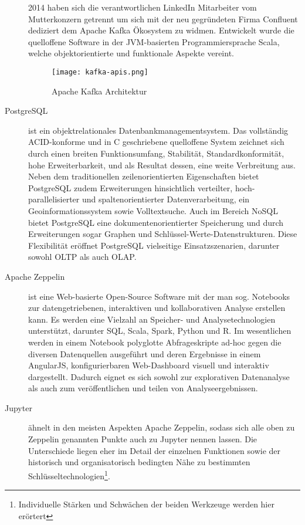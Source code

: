 \begin{description}
	2014 haben sich die verantwortlichen LinkedIn Mitarbeiter vom Mutterkonzern getrennt um sich mit der neu gegründeten Firma Confluent dediziert dem Apache Kafka Ökosystem zu widmen. Entwickelt wurde die quelloffene Software in der JVM-basierten Programmiersprache Scala, welche objektorientierte und funktionale Aspekte vereint.\autocite{kafka.apache} \autocite{wikiKafka} 
	\begin{figure}[h]
		\centering
		\texttt{[image: kafka-apis.png]}
		\caption[Apache Kafka Architektur]{Apache Kafka Architektur\autocite{kafka.apache}}
		\label{fig:KafkaArchitecture}
	\end{figure}
	\item [PostgreSQL] ist ein objektrelationales Datenbankmanagementsystem. Das vollständig ACID-konforme und in C geschriebene quelloffene System zeichnet sich durch einen breiten Funktionsumfang, Stabilität, Standardkonformität, hohe Erweiterbarkeit, und als Resultat dessen, eine weite Verbreitung aus. Neben dem traditionellen zeilenorientierten  Eigenschaften bietet PostgreSQL zudem Erweiterungen hinsichtlich verteilter, hoch-parallelisierter und  spaltenorientierter Datenverarbeitung, ein Geoinformationssystem sowie Volltextsuche. Auch im Bereich \acs{NoSQL} bietet PostgreSQL eine dokumentenorientierter Speicherung und durch Erweiterungen sogar Graphen und Schlüssel-Werte-Datenstrukturen. Diese Flexibilität eröffnet PostgreSQL vielseitige Einsatzszenarien, darunter sowohl \acs{OLTP} als auch \acs{OLAP}.\autocite{wikiPostgres}
	\item [Apache Zeppelin] ist eine Web-basierte Open-Source Software mit der man sog. Notebooks zur datengetriebenen, interaktiven und kollaborativen Analyse erstellen kann. Es werden eine Vielzahl an Speicher- und Analysetechnologien unterstützt, darunter SQL, Scala, Spark, Python und R. Im wesentlichen werden in einem Notebook polyglotte Abfrageskripte ad-hoc gegen die diversen Datenquellen ausgeführt und deren Ergebnisse in einem AngularJS, konfigurierbaren Web-Dashboard visuell und interaktiv dargestellt. Dadurch eignet es sich sowohl zur explorativen Datenanalyse als auch zum veröffentlichen und teilen von Analyseergebnissen.\autocite{zeppelin.apache}
	\item [Jupyter] ähnelt in den meisten Aspekten Apache Zeppelin, sodass sich alle oben zu Zeppelin genannten Punkte auch zu Jupyter nennen lassen. Die Unterschiede liegen eher im Detail der einzelnen Funktionen sowie der historisch und organisatorisch bedingten Nähe zu bestimmten Schlüsseltechnologien\footnote{Individuelle Stärken und Schwächen der beiden Werkzeuge werden hier erörtert\autocite{linkedinComparison}}.\autocite{jupyter.org}

\end{description}
